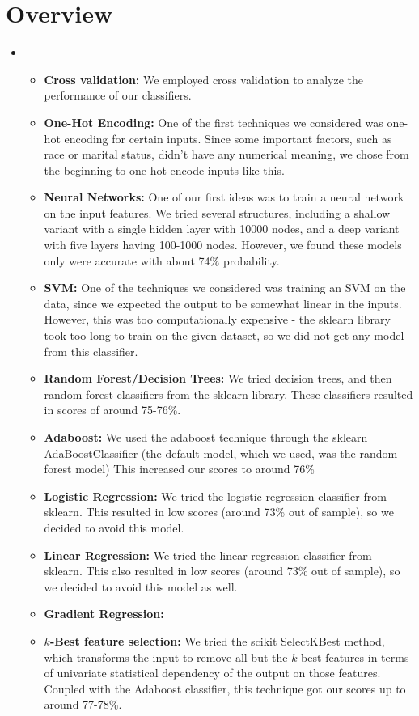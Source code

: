 \section{Overview}
\medskip
\begin{itemize}

    \item {}
    \begin{itemize}
    \item \textbf{Cross validation:} We employed cross validation to analyze the performance of our classifiers.
    \item \textbf{One-Hot Encoding:} One of the first techniques we considered was one-hot encoding for certain inputs. Since some important factors, such as race or marital status, didn't have any numerical meaning, we chose from the beginning to one-hot encode inputs like this.
    \item \textbf{Neural Networks:} One of our first ideas was to train a neural network on the input features. We tried several structures, including a shallow variant with a single hidden layer with 10000 nodes, and a deep variant with five layers having 100-1000 nodes. However, we found these models only were accurate with about 74\% probability.
    \item \textbf{SVM:} One of the techniques we considered was training an SVM on the data, since we expected the output to be somewhat linear in the inputs. However, this was too computationally expensive - the sklearn library took too long to train on the given dataset, so we did not get any model from this classifier.
    \item \textbf{Random Forest/Decision Trees:} We tried decision trees, and then random forest classifiers from  the sklearn library. These classifiers resulted in scores of around 75-76\%.
    \item \textbf{Adaboost:} We used the adaboost technique through the sklearn AdaBoostClassifier (the default model, which we used, was the random forest model) This increased our scores to around 76\%
    \item \textbf{Logistic Regression:} We tried the logistic regression classifier from sklearn. This resulted in low scores (around 73\% out of sample), so we decided to avoid this model.
    \item \textbf{Linear Regression:} We tried the linear regression classifier from sklearn. This also resulted in low scores (around 73\% out of sample), so we decided to avoid this model as well.
    \item \textbf{Gradient Regression:} %
    \item \textbf{$k$-Best feature selection:} We tried the scikit SelectKBest method, which transforms the input to remove all but the $k$ best features in terms of univariate statistical dependency of the output on those features. Coupled with the Adaboost classifier, this technique got our scores up to around 77-78\%.



\end{itemize}
\end{itemize}
